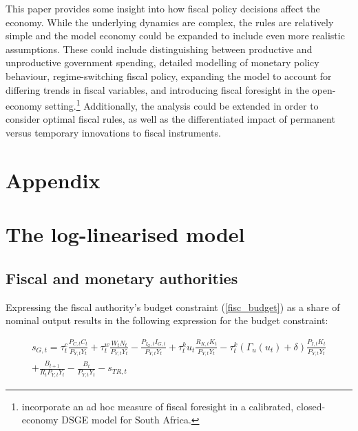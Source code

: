 \documentclass[a4paper,11pt]{article}
\numberwithin{equation}{section}
\begin{document}
	This paper provides some insight into how fiscal policy decisions affect the economy. While the underlying dynamics are complex, the rules are relatively simple and the model economy could be expanded to include even more realistic assumptions. These could include distinguishing between productive and unproductive government spending, detailed modelling of monetary	policy behaviour, regime-switching fiscal policy, expanding the model to account for differing trends in fiscal variables, and introducing fiscal foresight in the open-economy setting.\footnote{\cite{jooste2017} incorporate an ad hoc measure of fiscal foresight in a calibrated, closed-economy DSGE model for South Africa.} Additionally, the analysis could be extended in order to consider optimal fiscal rules, as well as the differentiated impact of permanent versus temporary innovations to fiscal instruments. 
	
\newpage
\thispagestyle{plain}
\singlespacing
\nocite{}



\newpage
\appendix 

\setcounter{table}{0} \renewcommand{\thetable}{A.\arabic{table}}
\setcounter{section}{0}
\setcounter{subsection}{0}
\renewcommand{\thesection}{A.\arabic{section}}  

\setcounter{equation}{0}
\renewcommand\theequation{A.\arabic{equation}}	 

\section*{Appendix} \label{app}

\section{The log-linearised model} 
	

	\subsection{Fiscal and monetary authorities}
	
	Expressing the fiscal authority's budget constraint (\ref{fisc_budget}) as a share of nominal output results in the following expression for the budget constraint:
	
	\begin{multline} \label{fisc_share}
	s_{G,t}=\tau_t^c\frac{P_{C,t}C_t}{P_{Y,t}Y_t}+\tau_t^w\frac{W_{t}N_t}{P_{Y,t}Y_t}-\frac{P_{I_G,t}I_{G,t}}{P_{Y,t}Y_t}+\tau_t^ku_t\frac{R_{K,t}K_t}{P_{Y,t}Y_t}-\tau_t^k\left(\Gamma_u(u_t)+\delta\right)\frac{P_{I,t}K_t}{P_{Y,t}Y_t}\\
	+\frac{B_{t+1}}{R_tP_{Y,t}Y_t}-\frac{B_t}{P_{Y,t}Y_t} -s_{TR,t}
	\end{multline}
	
\end{document}
